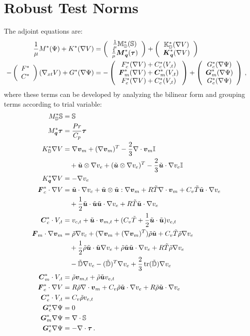 \documentclass[Dissertation.tex]{subfiles}
\begin{document}
\section{Robust Test Norms}
The adjoint equations are:
\begin{align*}
\frac{1}{\mu}M^*(\Psi)+K^*(\nabla V)&=\left( \begin{array}{c} \frac{1}{\mu}\mathbb{M}_{\mathbb{D}}^*(\mathbb{S})\\ \frac{1}{\mu}\boldsymbol M_{\boldsymbol q}^*(\boldsymbol\tau)\\ \end{array} \right)
+\left( \begin{array}{c} \mathbb{K}_{\mathbb{D}}^*(\nabla V)\\ \boldsymbol K_{\boldsymbol q}^*(\nabla V)\\ \end{array} \right)\\
-\left( \begin{array}{c} F^*\\ C^*\\ \end{array} \right)(\nabla_{xt} V)+G^*(\nabla\Psi)&=-\left( \begin{array}{c} F_c^*(\nabla V)+C_c^*(V_{,t})\\ \boldsymbol F_m^*(\nabla V)+\boldsymbol C_m^*(V_{,t})\\ F_e^*(\nabla V)+C_e^*(V_{,t})\\ \end{array} \right)
+\left( \begin{array}{c} G_c^*(\nabla\Psi)\\ \boldsymbol G_m^*(\nabla\Psi)\\ G_e^*(\nabla\Psi)\\ \end{array} \right)\,,
\end{align*}
where
these terms can be developed by analyzing the bilinear form and grouping terms according to trial variable:
\begin{align*}
M_\bbD^*\bbS&=\bbS\\
M_{\bfq}^*\bftau&=\frac{Pr}{C_p}\bftau\\
K_\bbD^*\Grad V&=\Grad\bfv_m+(\Grad\bfv_m)^T-\frac{2}{3}\Div\bfv_m\bbI
\\&\quad
+\tilde\bfu\otimes\Grad v_e+(\tilde\bfu\otimes\Grad v_e)^T-\frac{2}{3}\tilde\bfu\cdot\Grad v_e\bbI\\
K_{\bfq}^*\Grad V&=-\Grad v_e\\
\bfF_c^*\cdot\Grad V&=
\tilde\bfu\cdot\Grad v_c
+\tilde\bfu\otimes\tilde\bfu:\Grad\bfv_m+R\tilde T\Div\bfv_m
+C_v\tilde T\tilde\bfu\cdot\Grad v_e
\\&\quad
+\frac{1}{2}\tilde\bfu\cdot\tilde\bfu\tilde\bfu\cdot\Grad v_e+R\tilde T\tilde\bfu\cdot\Grad v_e\\
%
\bfC_c^*\cdot V_{,t}&=v_{c,t}+\tilde\bfu\cdot\bfv_{m,t}+(C_v\tilde T+\frac{1}{2}\tilde\bfu\cdot\tilde\bfu)v_{e,t}\\
%
\bfF_m\cdot\Grad\bfv_m&=\tilde\rho\Grad v_c
+(\Grad\bfv_m+(\Grad\bfv_m)^T)\tilde\rho\tilde\bfu
+C_v\tilde T\tilde\rho\Grad v_e
\\&\quad
+\frac{1}{2}\tilde\rho\tilde\bfu\cdot\tilde\bfu\Grad v_e+\tilde\rho\tilde\bfu\tilde\bfu\cdot\Grad v_e
+R\tilde T\tilde\rho\Grad v_e\\ 
&\quad-\tilde{\bbD}\Grad v_e-(\tilde{\bbD})^T\Grad v_e+\frac{2}{3}\trace(\tilde{\bbD})\Grad v_e
\\
%
\bfC_m^*\cdot V_{,t}&=\tilde\rho\bfv_{m,t}+\tilde\rho\tilde\bfu v_{e,t}\\
%
\bfF_e^*\cdot\Grad V&=R\tilde\rho\Div\bfv_m+C_v\tilde\rho\tilde\bfu\cdot\Grad v_e+R\tilde\rho\tilde\bfu\cdot\Grad v_e\\
%
\bfC_e^*\cdot V_{,t}&=C_v\tilde\rho v_{e,t}\\
%
\bfG_c^*\Grad\Psi&=0\\
%
\bfG_m^*\Grad\Psi&=\Div\bbS\\
%
\bfG_e^*\Grad\Psi&=-\Div\bftau
\,.
\end{align*}
\end{document}
